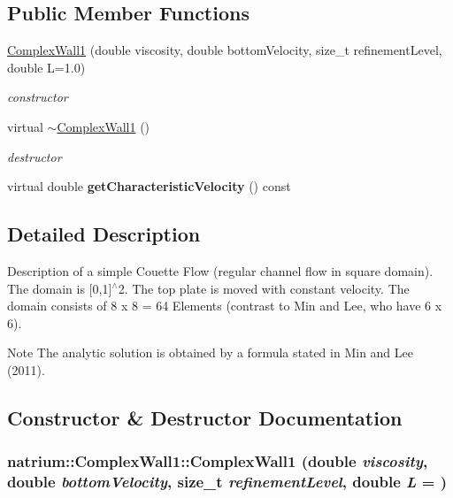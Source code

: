 \subsection*{Public Member Functions}
\begin{DoxyCompactItemize}
\item 
\hyperlink{classnatrium_1_1ComplexWall1_ad619c81f979a47c447fc0061bed20e05}{ComplexWall1} (double viscosity, double bottomVelocity, size\_\-t refinementLevel, double L=1.0)
\begin{DoxyCompactList}\small\item\em constructor \item\end{DoxyCompactList}\item 
\hypertarget{classnatrium_1_1ComplexWall1_a6d68cdec98529c139716ae98e8149d30}{
virtual \hyperlink{classnatrium_1_1ComplexWall1_a6d68cdec98529c139716ae98e8149d30}{$\sim$ComplexWall1} ()}
\label{classnatrium_1_1ComplexWall1_a6d68cdec98529c139716ae98e8149d30}

\begin{DoxyCompactList}\small\item\em destructor \item\end{DoxyCompactList}\item 
\hypertarget{classnatrium_1_1ComplexWall1_a782e4262d5c717656803f43eb4e05202}{
virtual double {\bfseries getCharacteristicVelocity} () const }
\label{classnatrium_1_1ComplexWall1_a782e4262d5c717656803f43eb4e05202}

\end{DoxyCompactItemize}


\subsection{Detailed Description}
Description of a simple Couette Flow (regular channel flow in square domain). The domain is \mbox{[}0,1\mbox{]}$^\wedge$2. The top plate is moved with constant velocity. The domain consists of 8 x 8 = 64 Elements (contrast to Min and Lee, who have 6 x 6). \begin{DoxyNote}{Note}
The analytic solution is obtained by a formula stated in Min and Lee (2011). 
\end{DoxyNote}


\subsection{Constructor \& Destructor Documentation}
\hypertarget{classnatrium_1_1ComplexWall1_ad619c81f979a47c447fc0061bed20e05}{
\subsubsection[{ComplexWall1}]{\setlength{\rightskip}{0pt plus 5cm}natrium::ComplexWall1::ComplexWall1 (double {\em viscosity}, \/  double {\em bottomVelocity}, \/  size\_\-t {\em refinementLevel}, \/  double {\em L} = {})}}
\label{classnatrium_1_1ComplexWall1_ad619c81f979a47c447fc0061bed20e05}


